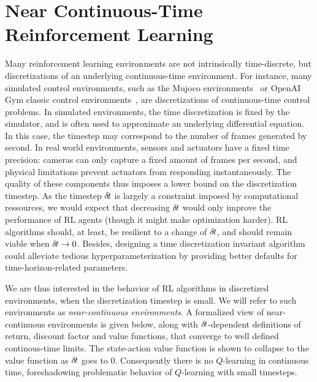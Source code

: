\section{Near Continuous-Time Reinforcement Learning}
\label{sec:framework}

Many reinforcement learning environments are not intrinsically
time-discrete, but discretizations of an underlying continuous-time
environment. For instance, many simulated control environments, such as
the Mujoco environments~\cite{ddpg} or OpenAI Gym classic control
environments~\cite{gym}, are discretizations of continuous-time control
problems.  In simulated environments, the time discretization is fixed by
the simulator, and is often used to approximate an underlying
differential equation.  In this case, the timestep may correspond to the
number of frames generated by second.  In real world environments,
sensors and actuators have a fixed time precision: cameras can only
capture a fixed amount of frames per second, and physical limitations
prevent actuators from responding instantaneously. The quality of these
components thus imposes a lower bound on the discretization timestep. As
the timestep ${\delta\hspace{-.1em}t}$ is 
largely a constraint imposed by computational ressources, we
would expect that decreasing ${\delta\hspace{-.1em}t}$ would only improve the performance
of RL agents (though it might make optimization
harder).  RL algorithms should, at least, be resilient to a change of
${\delta\hspace{-.1em}t}$, and should remain viable when ${\delta\hspace{-.1em}t} \rightarrow 0$.
Besides, designing a time discretization invariant algorithm could
alleviate tedious hyperparameterization by providing better defaults for
time-horizon-related parameters.

We are thus interested in the behavior of RL
algorithms in discretized environments, when the discretization timestep
is small. We will refer to such environments as \emph{near-continuous
environments}.
A formalized view of near-continuous environments is
given below, along with ${\delta\hspace{-.1em}t}$-dependent definitions of return, discount
factor and value functions, that converge to well defined
continous-time limits. The state-action value
function is shown to collapse to the value function as ${\delta\hspace{-.1em}t}$ goes to $0$.
Consequently there is no $Q$-learning in continuous time, foreshadowing
problematic behavior of $Q$-learning with small timesteps.

